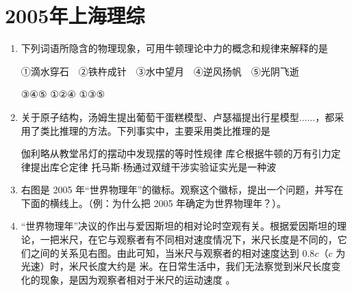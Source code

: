 \documentclass[\gkver]{gaokaozhenti}
\begin{document}
\chapter{2005年上海理综}

\begin{enumerate}
\item
下列词语所隐含的物理现象，可用牛顿理论中力的概念和规律来解释的是

①滴水穿石　②铁杵成针　③水中望月　④逆风扬帆　⑤光阴飞逝

{③④⑤}
{①②④}
{①③⑤}


\item
关于原子结构，汤姆生提出葡萄干蛋糕模型、卢瑟福提出行星模型$\ldots\ldots$，都采用了类比推理的方法。下列事实中，主要采用类比推理的是

{伽利略从教堂吊灯的摆动中发现摆的等时性规律}
{库仑根据牛顿的万有引力定律提出库仑定律}
{托马斯$\cdot$杨通过双缝干涉实验证实光是一种波}


\item
右图是 2005 年“世界物理年”的徽标。观察这个徽标，提出一个问题，并写在下面的横线上。（例：为什么把 2005 年确定为世界物理年？）。



\item
“世界物理年”决议的作出与爱因斯坦的相对论时空观有关。根据爱因斯坦的理论，一把米尺，在它与观察者有不同相对速度情况下，米尺长度是不同的，它们之间的关系见右图。由此可知，当米尺与观察者的相对速度达到 $0.8c$（$c$ 为光速）时，米尺长度大约是  米。在日常生活中，我们无法察觉到米尺长度变化的现象，是因为观察者相对于米尺的运动速度 。



\end{enumerate}
\end{document}

